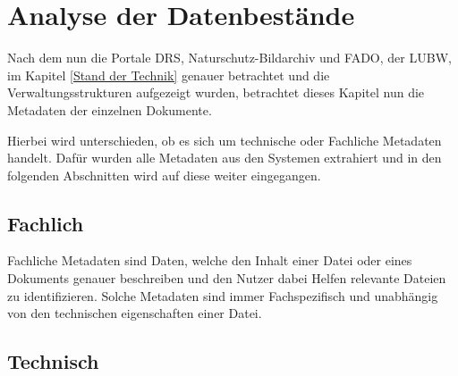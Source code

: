 \section{Analyse der Datenbest\"ande} \label{Analyse Datenbestaende}
Nach dem nun die Portale \ac{DRS}, Naturschutz-Bildarchiv und \ac{FADO}, der \ac{LUBW}, im Kapitel \ref{Stand der Technik} genauer betrachtet und die Verwaltungsstrukturen aufgezeigt wurden, betrachtet dieses Kapitel nun die Metadaten der einzelnen Dokumente.

Hierbei wird unterschieden, ob es sich um technische oder Fachliche Metadaten handelt. Daf\"ur wurden alle Metadaten aus den Systemen extrahiert und in den folgenden Abschnitten wird auf diese weiter eingegangen.
\subsection{Fachlich}
Fachliche Metadaten sind Daten, welche den Inhalt einer Datei oder eines Dokuments genauer beschreiben und den Nutzer dabei Helfen relevante Dateien zu identifizieren. Solche Metadaten sind immer Fachspezifisch und unabh\"angig von den technischen eigenschaften einer Datei.
\cite{Fachliche_Metadaten_Wissensportal_BI} \cite{Fachliche_Metadaten_msg} \cite{DHW_Wiki_Metadaten}

\subsection{Technisch}